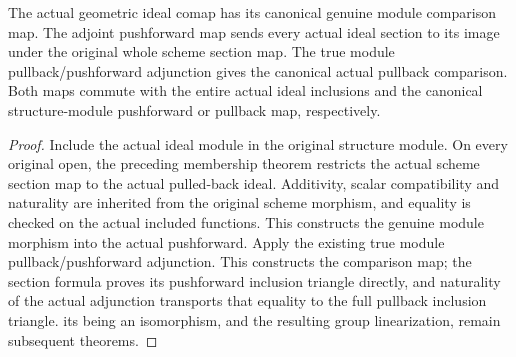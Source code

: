 \begin{lemma}
\label{lem:actual-ideal-module-pullback-map}
\leanok
The actual geometric ideal comap has its canonical genuine module
comparison map.  The adjoint pushforward map sends every actual
ideal section to its image under the original whole scheme section
map.  The true module pullback/pushforward adjunction gives the
canonical actual pullback comparison.
Both maps commute with the entire actual ideal inclusions and the
canonical structure-module pushforward or pullback map, respectively.
\end{lemma}
\begin{proof}
Include the actual ideal module in the original structure module.
On every original open, the preceding membership theorem restricts
the actual scheme section map to the actual pulled-back ideal.
Additivity, scalar compatibility and naturality are inherited from
the original scheme morphism, and equality is checked on the actual
included functions.  This constructs the genuine module morphism
into the actual pushforward.  Apply the existing true module
pullback/pushforward adjunction.  This constructs the comparison map;
the section formula proves its pushforward inclusion triangle directly,
and naturality of the actual adjunction transports that equality to
the full pullback inclusion triangle.
its being an isomorphism, and the resulting group linearization,
remain subsequent theorems.
\end{proof}
